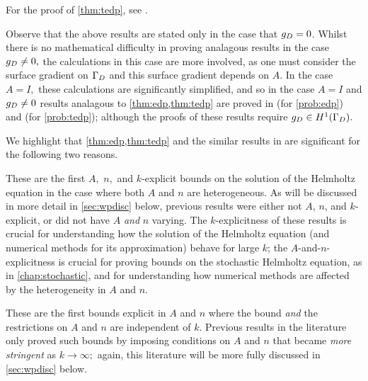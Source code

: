For the proof of \cref{thm:tedp}, see \cite[Theorem A.6 (i)]{GrPeSp:19}.

Observe that the above results are stated only in the case that $g_{D} = 0$. Whilst there is no mathematical difficulty in proving analagous results in the case $g_{D} \neq 0,$ the calculations in this case are more involved, as one must consider the surface gradient on $\Gamma_{D}$  and this surface gradient depends on $A.$ In the case $A=I,$ these calculations are significantly simplified, and so in the case $A=I$ and $g_{D} \neq 0$ results analagous to \cref{thm:edp,thm:tedp} are proved in \cite[Theorem 2.19(ii)]{GrPeSp:19} (for \cref{prob:edp}) and \cite[Theorem A.6(iv)]{GrPeSp:19} (for \cref{prob:tedp}); although the proofs of these results require $\gD \in \HoGD.$

We highlight that \cref{thm:edp,thm:tedp} and the similar results in \cite{GrPeSp:19} are significant for the following two reasons.
\ben
\item These are the first $A,$ $n,$ and $k$-explicit bounds on the solution of the Helmholtz equation in the case where both $A$ and $n$ are heterogeneous. As will be discussed in more detail in \cref{sec:wpdisc} below, previous results were either not $A$, $n$, and $k$-explicit, or did not have $A$ \emph{and} $n$ varying. The $k$-explicitness of these results is crucial for understanding how the solution of the Helmholtz equation (and numerical methods for its approximation) behave for large $k$; the $A$-and-$n$-explicitness is crucial for proving bounds on the stochastic Helmholtz equation, as in \cref{chap:stochastic}, and for understanding how numerical methods are affected by the heterogeneity in $A$ and $n.$
  \item These are the first bounds explicit in $A$ and $n$ where the bound \emph{and} the restrictions on $A$ and $n$ are independent of $k.$ Previous results in the literature only proved such bounds by imposing conditions on $A$ and $n$ that became \emph{more stringent} as $k \rightarrow \infty;$ again, this literature will be more fully discussed in \cref{sec:wpdisc} below.
\een

